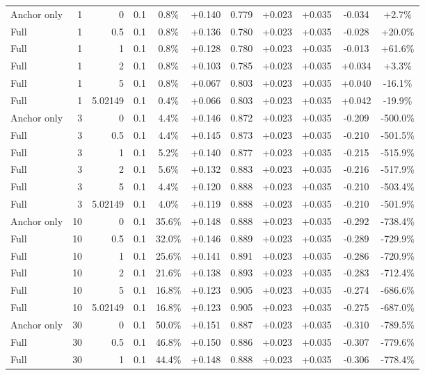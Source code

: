 \begin{table}[htbp]
\begin{tabular}{lrrrccccccc}
Anchor only & 1 & 0 & 0.1 & 0.8\% & +0.140 & 0.779 & +0.023 & +0.035 & -0.034 & +2.7\% \\
Full & 1 & 0.5 & 0.1 & 0.8\% & +0.136 & 0.780 & +0.023 & +0.035 & -0.028 & +20.0\% \\
Full & 1 & 1 & 0.1 & 0.8\% & +0.128 & 0.780 & +0.023 & +0.035 & -0.013 & +61.6\% \\
Full & 1 & 2 & 0.1 & 0.8\% & +0.103 & 0.785 & +0.023 & +0.035 & +0.034 & +3.3\% \\
Full & 1 & 5 & 0.1 & 0.8\% & +0.067 & 0.803 & +0.023 & +0.035 & +0.040 & -16.1\% \\
Full & 1 & 5.02149 & 0.1 & 0.4\% & +0.066 & 0.803 & +0.023 & +0.035 & +0.042 & -19.9\% \\
Anchor only & 3 & 0 & 0.1 & 4.4\% & +0.146 & 0.872 & +0.023 & +0.035 & -0.209 & -500.0\% \\
Full & 3 & 0.5 & 0.1 & 4.4\% & +0.145 & 0.873 & +0.023 & +0.035 & -0.210 & -501.5\% \\
Full & 3 & 1 & 0.1 & 5.2\% & +0.140 & 0.877 & +0.023 & +0.035 & -0.215 & -515.9\% \\
Full & 3 & 2 & 0.1 & 5.6\% & +0.132 & 0.883 & +0.023 & +0.035 & -0.216 & -517.9\% \\
Full & 3 & 5 & 0.1 & 4.4\% & +0.120 & 0.888 & +0.023 & +0.035 & -0.210 & -503.4\% \\
Full & 3 & 5.02149 & 0.1 & 4.0\% & +0.119 & 0.888 & +0.023 & +0.035 & -0.210 & -501.9\% \\
Anchor only & 10 & 0 & 0.1 & 35.6\% & +0.148 & 0.888 & +0.023 & +0.035 & -0.292 & -738.4\% \\
Full & 10 & 0.5 & 0.1 & 32.0\% & +0.146 & 0.889 & +0.023 & +0.035 & -0.289 & -729.9\% \\
Full & 10 & 1 & 0.1 & 25.6\% & +0.141 & 0.891 & +0.023 & +0.035 & -0.286 & -720.9\% \\
Full & 10 & 2 & 0.1 & 21.6\% & +0.138 & 0.893 & +0.023 & +0.035 & -0.283 & -712.4\% \\
Full & 10 & 5 & 0.1 & 16.8\% & +0.123 & 0.905 & +0.023 & +0.035 & -0.274 & -686.6\% \\
Full & 10 & 5.02149 & 0.1 & 16.8\% & +0.123 & 0.905 & +0.023 & +0.035 & -0.275 & -687.0\% \\
Anchor only & 30 & 0 & 0.1 & 50.0\% & +0.151 & 0.887 & +0.023 & +0.035 & -0.310 & -789.5\% \\
Full & 30 & 0.5 & 0.1 & 46.8\% & +0.150 & 0.886 & +0.023 & +0.035 & -0.307 & -779.6\% \\
Full & 30 & 1 & 0.1 & 44.4\% & +0.148 & 0.888 & +0.023 & +0.035 & -0.306 & -778.4\% \\

\end{tabular}
\end{table}
